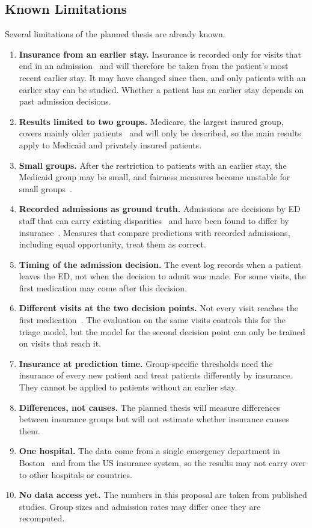 \subsection{Known Limitations}\label{subsection::limitations}

Several limitations of the planned thesis are already known.

\begin{enumerate}
  \item \textbf{Insurance from an earlier stay.} Insurance is recorded only for visits that end in an admission~\cite{mimicdocs} and will therefore be taken from the patient's most recent earlier stay. It may have changed since then, and only patients with an earlier stay can be studied. Whether a patient has an earlier stay depends on past admission decisions.
  \item \textbf{Results limited to two groups.} Medicare, the largest insured group, covers mainly older patients~\cite{roosli2022peeking} and will only be described, so the main results apply to Medicaid and privately insured patients.
  \item \textbf{Small groups.} After the restriction to patients with an earlier stay, the Medicaid group may be small, and fairness measures become unstable for small groups~\cite{sanchezmarques2026addressing}.
  \item \textbf{Recorded admissions as ground truth.} Admissions are decisions by ED staff that can carry existing disparities~\cite{rajkomar2018ensuring} and have been found to differ by insurance~\cite{venkatesh2019association}. Measures that compare predictions with recorded admissions, including equal opportunity, treat them as correct.
  \item \textbf{Timing of the admission decision.} The event log records when a patient leaves the ED, not when the decision to admit was made. For some visits, the first medication may come after this decision.
  \item \textbf{Different visits at the two decision points.} Not every visit reaches the first medication~\cite{wei2025curation}. The evaluation on the same visits controls this for the triage model, but the model for the second decision point can only be trained on visits that reach it.
  \item \textbf{Insurance at prediction time.} Group-specific thresholds need the insurance of every new patient and treat patients differently by insurance. They cannot be applied to patients without an earlier stay.
  \item \textbf{Differences, not causes.} The planned thesis will measure differences between insurance groups but will not estimate whether insurance causes them.
  \item \textbf{One hospital.} The data come from a single emergency department in Boston~\cite{wei2025curation,lett2025intersectional} and from the US insurance system, so the results may not carry over to other hospitals or countries.
  \item \textbf{No data access yet.} The numbers in this proposal are taken from published studies. Group sizes and admission rates may differ once they are recomputed.
\end{enumerate}
